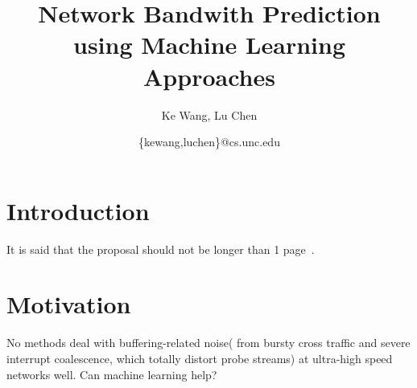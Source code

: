 \documentclass[11pt]{article}
\title{Network Bandwith Prediction using Machine Learning Approaches}
\author{Ke Wang, Lu Chen} %
\date{\{kewang,luchen\}@cs.unc.edu}
\begin{document}
\maketitle

\section{Introduction}
\label{sec:introduction}
It is said that the proposal should not be longer than 1 page~\cite{yin2014}.
\section{Motivation}
\label{sec:motivation}
No methods deal with buffering-related noise( from bursty cross traffic and
severe interrupt coalescence, which totally distort probe streams) at
ultra-high speed networks well. Can machine learning help?







\end{document}
